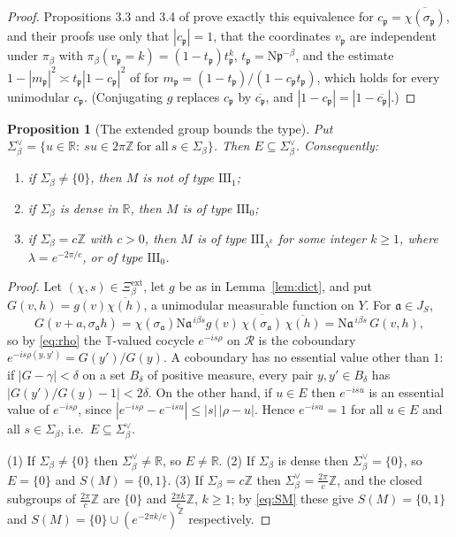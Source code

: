 \documentclass[11pt]{amsart}
\numberwithin{equation}{section}
\newtheorem{proposition}[theorem]{Proposition}
\theoremstyle{definition}
\theoremstyle{remark}
\newcommand{\Z}{\mathbb{Z}}
\newcommand{\R}{\mathbb{R}}
\newcommand{\T}{\mathbb{T}}
\newcommand{\cR}{\mathcal{R}}
\newcommand{\pp}{\mathfrak{p}}
\newcommand{\aaa}{\mathfrak{a}}
\newcommand{\Ns}{\mathrm{N}}
\newcommand{\Xiext}{\Xi^{\mathrm{ext}}_\beta}
\begin{document}
\begin{proof}
Propositions 3.3 and 3.4 of \cite{Main} prove exactly this equivalence for
$c_\pp=\overline{\chi(\sigma_\pp)}$, and their proofs use only that $|c_\pp|=1$, that the
coordinates $v_\pp$ are independent under $\pi_\beta$ with $\pi_\beta(v_\pp=k)=(1-t_\pp)t_\pp^k$,
$t_\pp=\Ns\pp^{-\beta}$, and the estimate $1-|m_\pp|^2\asymp t_\pp|1-c_\pp|^2$ of
\cite[Lem.~3.2]{Main} for $m_\pp=(1-t_\pp)/(1-c_\pp t_\pp)$, which holds for every unimodular
$c_\pp$. (Conjugating $g$ replaces $c_\pp$ by $\overline{c_\pp}$, and
$|1-c_\pp|=|1-\overline{c_\pp}|$.)
\end{proof}

\begin{proposition}[The extended group bounds the type]\label{prop:bound}
Put $\Sigma_\beta^\vee=\{u\in\R:\ su\in2\pi\Z\ \text{for all}\ s\in\Sigma_\beta\}$. Then
$E\subseteq\Sigma_\beta^\vee$. Consequently:
\begin{enumerate}
\item if $\Sigma_\beta\ne\{0\}$, then $M$ is not of type $\mathrm{III}_1$;
\item if $\Sigma_\beta$ is dense in $\R$, then $M$ is of type $\mathrm{III}_0$;
\item if $\Sigma_\beta=c\Z$ with $c>0$, then $M$ is of type $\mathrm{III}_{\lambda^k}$ for
some integer $k\ge1$, where $\lambda=e^{-2\pi/c}$, or of type $\mathrm{III}_0$.
\end{enumerate}
\end{proposition}

\begin{proof}
Let $(\chi,s)\in\Xiext$, let $g$ be as in Lemma~\ref{lem:dict}, and put
$G(v,h)=g(v)\overline{\chi(h)}$, a unimodular measurable function on $Y$. For $\aaa\in J_S$,
\[
G(v+a,\sigma_\aaa h)=\chi(\sigma_\aaa)\Ns\aaa^{\,i\beta s}g(v)\,\overline{\chi(\sigma_\aaa)}\,\overline{\chi(h)}
=\Ns\aaa^{\,i\beta s}\,G(v,h),
\]
so by \eqref{eq:rho} the $\T$-valued cocycle $e^{-is\rho}$ on $\cR$ is the coboundary
$e^{-is\rho(y,y')}=G(y')/G(y)$. A coboundary has no essential value other than $1$: if
$|G-\gamma|<\delta$ on a set $B_\delta$ of positive measure, every pair $y,y'\in B_\delta$
has $|G(y')/G(y)-1|<2\delta$. On the other hand, if $u\in E$ then $e^{-isu}$ is an essential
value of $e^{-is\rho}$, since $|e^{-is\rho}-e^{-isu}|\le|s|\,|\rho-u|$. Hence
$e^{-isu}=1$ for all $u\in E$ and all $s\in\Sigma_\beta$, i.e.\ $E\subseteq\Sigma_\beta^\vee$.

(1) If $\Sigma_\beta\ne\{0\}$ then $\Sigma_\beta^\vee\ne\R$, so $E\ne\R$. (2) If $\Sigma_\beta$
is dense then $\Sigma_\beta^\vee=\{0\}$, so $E=\{0\}$ and $S(M)=\{0,1\}$. (3) If
$\Sigma_\beta=c\Z$ then $\Sigma_\beta^\vee=\frac{2\pi}{c}\Z$, and the closed subgroups of
$\frac{2\pi}{c}\Z$ are $\{0\}$ and $\frac{2\pi k}{c}\Z$, $k\ge1$; by \eqref{eq:SM} these give
$S(M)=\{0,1\}$ and $S(M)=\{0\}\cup(e^{-2\pi k/c})^{\Z}$ respectively.
\end{proof}
\end{document}
